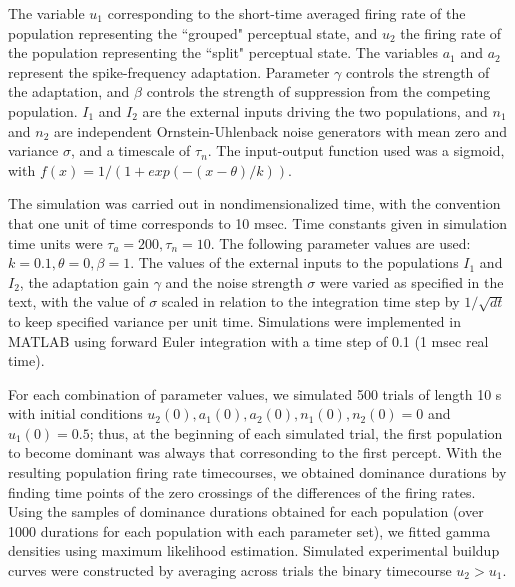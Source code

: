\documentclass[10pt]{article}
\begin{document}
The variable $u_1$ corresponding to the short-time averaged firing rate of the population representing the ``grouped" perceptual state, and $u_2$ the firing rate of the population representing the ``split" perceptual state. The variables $a_1$ and $a_2$ represent the spike-frequency adaptation. Parameter $\gamma$ controls the strength of the adaptation, and $\beta$ controls the strength of suppression from the competing population. $I_1$ and $I_2$ are the external inputs driving the two populations, and $n_1$ and $n_2$ are independent Ornstein-Uhlenback noise generators with mean zero and variance $\sigma$, and a timescale of $\tau_n$. 
The input-output function used was a sigmoid, with $f (x) = 1/(1 + exp(−(x − \theta )/ k))$. 

The simulation was carried out in nondimensionalized time, with the convention that one unit of time corresponds to 10 msec. Time constants given in simulation time units were $\tau_a = 200, \tau_n = 10$. The following parameter values are used: $k = 0.1, \theta = 0, \beta = 1$.  The values of the external inputs to the populations $I_1$ and $I_2$, the adaptation gain $\gamma$ and the noise strength $\sigma$ were varied as specified in the text, with the value of $\sigma$ scaled in relation to the integration time step by $1/\sqrt{dt}$ to keep specified variance per unit time. Simulations were implemented in MATLAB using forward Euler integration with a time step of 0.1 (1 msec real time).

For each combination of parameter values, we simulated 500 trials of length 10 s with initial conditions $u_2(0), a_1(0), a_2(0), n_1(0), n_2(0) = 0$ and $u_1(0) = 0.5$; thus, at the beginning of each simulated trial, the first population to become dominant was always that corresonding to the first percept. With the resulting population firing rate timecourses, we obtained dominance durations by finding time points of the zero crossings of the differences of the firing rates. Using the samples of dominance durations obtained for each population (over 1000 durations for each population with each parameter set), we fitted gamma densities using maximum likelihood estimation. Simulated experimental buildup curves were constructed by averaging across trials the binary timecourse $u_2 > u_1$. 
\end{document}
